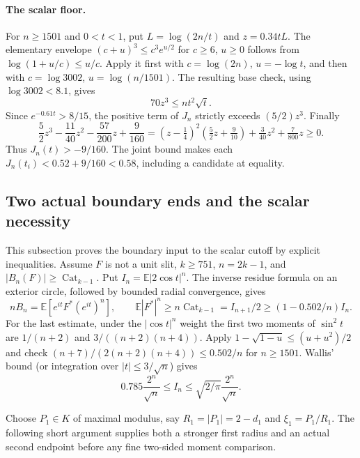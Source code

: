 \documentclass[11pt]{article}
\newcommand{\E}{\mathbb E}
\newcommand{\Cat}{\operatorname{Cat}}
\begin{document}
	\paragraph{The scalar floor.}
	For $n\geq1501$ and $0<t<1$, put
	$L=\log(2n/t)$ and $z=0.34tL$.  The elementary envelope
	$(c+u)^3\leq c^3e^{u/2}$ for $c\geq6$, $u\geq0$ follows from
	$\log(1+u/c)\leq u/c$.  Apply it first with
	$c=\log(2n)$, $u=-\log t$, and then with
	$c=\log3002$, $u=\log(n/1501)$.  The resulting base check,
	using $\log3002<8.1$, gives
	\[
	70z^3\leq nt^2\sqrt t.
	\]
	Since $e^{-0.61t}>8/15$, the positive term of $J_n$
	strictly exceeds $(5/2)z^3$.  Finally
	\[
	\frac52z^3-\frac{11}{40}z^2-\frac{57}{200}z+\frac9{160}
	=(z-\tfrac14)^2(\tfrac52z+\tfrac9{10})
	+\tfrac3{40}z^2+\tfrac7{800}z\geq0.
	\]
	Thus $J_n(t)>-9/160$.  The joint bound makes each
	$J_n(t_i)<0.52+9/160<0.58$, including a candidate at equality.
	
	\subsection{Two actual boundary ends and the scalar necessity}
	This subsection proves the boundary input to the scalar cutoff
	by explicit inequalities.  Assume $F$ is not a unit slit,
	$k\geq751$, $n=2k-1$, and
	$|B_n(F)|\geq\Cat_{k-1}$.  Put
	$I_n=\E|2\cos t|^n$.  The inverse residue formula on an exterior
	circle, followed by bounded radial convergence, gives
	\begin{equation}\label{eq:boundary-candidate}
		nB_n=\E[e^{it}F^*(e^{it})^n],\qquad
		\E|F^*|^n\geq n\Cat_{k-1}=I_{n+1}/2
		\geq(1-0.502/n)I_n.
	\end{equation}
	For the last estimate, under the $|\cos t|^n$ weight the first two
	moments of $\sin^2t$ are $1/(n+2)$ and
	$3/((n+2)(n+4))$.  Apply
	$1-\sqrt{1-u}\leq(u+u^2)/2$ and check
	$(n+7)/(2(n+2)(n+4))\leq0.502/n$ for $n\geq1501$.
	Wallis' bound (or integration over $|t|\leq3/\sqrt n$) gives
	\begin{equation}\label{eq:In-bounds}
		0.785\frac{2^n}{\sqrt n}\leq I_n
		\leq\sqrt{2/\pi}\frac{2^n}{\sqrt n}.
	\end{equation}
	
	Choose $P_1\in K$ of maximal modulus, say
	$R_1=|P_1|=2-d_1$ and $\xi_1=P_1/R_1$.  The following short
	argument supplies both a stronger first radius and an actual second
	endpoint before any fine two-sided moment comparison.
	
\end{document}
